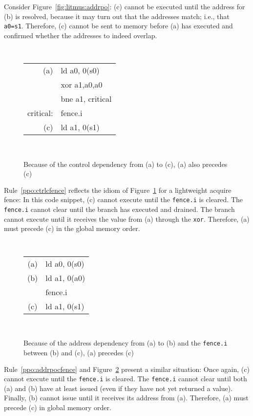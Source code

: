 Consider Figure~\ref{fig:litmus:addrpo}:
(c) cannot be executed until the address for (b) is resolved, because it may turn out that the addresses match; i.e., that {\tt a0=s1}.  Therefore, (c) cannot be sent to memory before (a) has executed and confirmed whether the addresses to indeed overlap.

\begin{figure}[h!]
  \centering
  {
    \tt\small
    \begin{tabular}{rl}
    (a)       & ld a0, 0(s0) \\
              & xor a1,a0,a0 \\
              & bne a1, critical \\
    critical: & fence.i \\
    (c)       & ld a1, 0(s1) \\
    \end{tabular}
  }
  ~~~~
  \diagram
  \caption{Because of the control dependency from (a) to (c), (a) also precedes (c)}
  \label{fig:litmus:ctrlcfence}
\end{figure}

Rule~\ref{ppo:ctrlcfence} reflects the idiom of Figure~\ref{fig:litmus:ctrlcfence} for a lightweight acquire fence:
In this code snippet, (c) cannot execute until the {\tt fence.i} is cleared.  The {\tt fence.i} cannot clear until the branch has executed and drained.  The branch cannot execute until it receives the value from (a) through the {\tt xor}.  Therefore, (a) must precede (c) in the global memory order.

\begin{figure}[h!]
  \centering
  {
    \tt\small
    \begin{tabular}{cl}
    (a)       & ld a0, 0(s0) \\
    (b)       & ld a1, 0(a0) \\
              & fence.i \\
    (c)       & ld a1, 0(s1) \\
    \end{tabular}
  }
  ~~~~
  \diagram
  \caption{Because of the address dependency from (a) to (b) and the {\tt fence.i} between (b) and (c), (a) precedes (c)}
  \label{fig:litmus:addrpocfence}
\end{figure}

Rule~\ref{ppo:addrpocfence} and Figure~\ref{fig:litmus:addrpocfence} present a similar situation:
Once again, (c) cannot execute until the {\tt fence.i} is cleared.  The {\tt fence.i} cannot clear until both (a) and (b) have at least issued (even if they have not yet returned a value).  Finally, (b) cannot issue until it receives its address from (a).  Therefore, (a) must precede (c) in global memory order.

